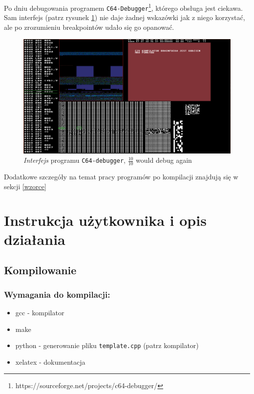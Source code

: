 \documentclass[a4paper,12pt]{article}
\begin{document}
    Po dniu debugowania programem \texttt{C64-Debugger}\footnote{https://sourceforge.net/projects/c64-debugger/}, którego obsługa jest ciekawa. Sam interfejs (patrz rysunek \ref{c64-debug}) nie daje żadnej wskazówki jak z niego korzystać, ale po zrozumieniu breakpointów udało się go opanować.

    \begin{figure}[h]
        \includegraphics[scale=0.3]{c64debug.png}
        \centering
        \caption{\emph{Interfejs} programu \texttt{C64-debugger}, $\frac{10}{10}$ would debug again}
        \label{c64-debug}
    \end{figure}

    Dodatkowe szczegóły na temat pracy programów po kompilacji znajdują się w sekcji \ref{wzorce}

    \section{Instrukcja użytkownika i opis działania}

    \subsection{Kompilowanie}

    \subsubsection*{Wymagania do kompilacji:}
    \begin{itemize}
        \item gcc - kompilator
        \item make
        \item python - generowanie pliku \texttt{template.cpp} (patrz kompilator)
        \item xelatex - dokumentacja
    \end{itemize}
\end{document}
